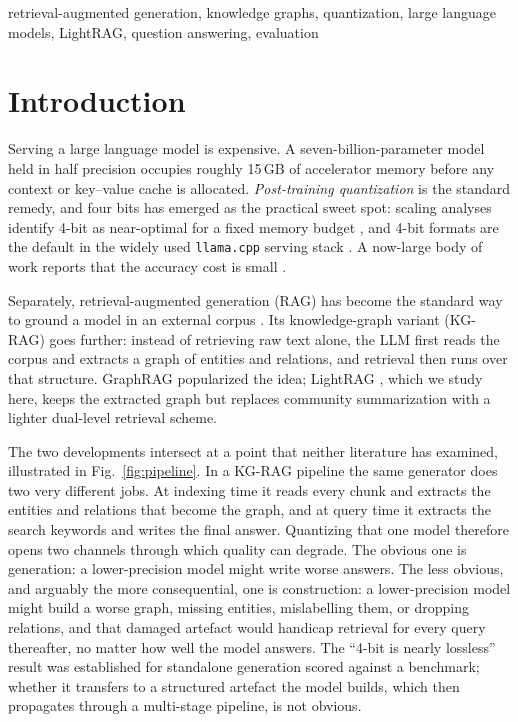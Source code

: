 \documentclass[conference, table]{IEEEtran}
\begin{document}
\begin{IEEEkeywords}
retrieval-augmented generation, knowledge graphs, quantization, large language models, LightRAG, question answering, evaluation
\end{IEEEkeywords}

\section{Introduction}

\noindent
Serving a large language model is expensive. A seven-billion-parameter model held in half precision occupies roughly 15\,GB of accelerator memory before any context or key--value cache is allocated. \emph{Post-training quantization} is the standard remedy, and four bits has emerged as the practical sweet spot: scaling analyses identify 4-bit as near-optimal for a fixed memory budget \cite{dettmers2023case}, and 4-bit formats are the default in the widely used \texttt{llama.cpp} serving stack \cite{llamacpp}. A now-large body of work reports that the accuracy cost is small \cite{ptqsurvey2021,gptq2023,awq2024,quanteval2024}.

\noindent
Separately, retrieval-augmented generation (RAG) has become the standard way to ground a model in an external corpus \cite{rag2020}. Its knowledge-graph variant (KG-RAG) goes further: instead of retrieving raw text alone, the LLM first reads the corpus and extracts a graph of entities and relations, and retrieval then runs over that structure. GraphRAG \cite{graphrag2024} popularized the idea; LightRAG \cite{lightrag2024}, which we study here, keeps the extracted graph but replaces community summarization with a lighter dual-level retrieval scheme.

\noindent
The two developments intersect at a point that neither literature has examined, illustrated in Fig.~\ref{fig:pipeline}. In a KG-RAG pipeline the same generator does two very different jobs. At indexing time it reads every chunk and extracts the entities and relations that become the graph, and at query time it extracts the search keywords and writes the final answer. Quantizing that one model therefore opens two channels through which quality can degrade. The obvious one is generation: a lower-precision model might write worse answers. The less obvious, and arguably the more consequential, one is construction: a lower-precision model might build a worse graph, missing entities, mislabelling them, or dropping relations, and that damaged artefact would handicap retrieval for every query thereafter, no matter how well the model answers. The ``4-bit is nearly lossless'' result was established for standalone generation scored against a benchmark; whether it transfers to a structured artefact the model builds, which then propagates through a multi-stage pipeline, is not obvious.
\end{document}
